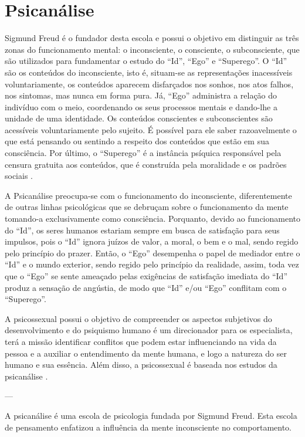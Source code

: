 \section{Psicanálise}\label{psicanalise}

Sigmund Freud é o fundador desta escola e possui o objetivo em distinguir as três zonas do funcionamento mental: o inconsciente, o consciente, o subconsciente, que são utilizados para fundamentar o estudo do ``Id'', ``Ego'' e ``Superego''. 
O ``Id'' são os conteúdos do inconsciente, isto é, situam-se as representações inacessíveis voluntariamente, os conteúdos aparecem disfarçados nos sonhos, nos atos falhos, nos sintomas, mas nunca em forma pura. 
Já, ``Ego'' administra a relação do indivíduo com o meio, coordenando os seus processos mentais e dando-lhe a unidade de uma identidade. Os conteúdos conscientes e subconscientes são acessíveis voluntariamente pelo sujeito. É possível para ele saber razoavelmente o que está pensando ou sentindo a respeito dos conteúdos que estão em sua consciência.
Por último, o ``Superego'' é a instância psíquica responsável pela censura gratuita aos conteúdos, que é construída pela moralidade e os padrões sociais \cite{silva2007psicologia_educacao}.

A Psicanálise preocupa-se com o funcionamento do inconsciente, diferentemente de outras linhas psicológicas que se debruçam sobre o funcionamento da mente tomando-a exclusivamente como consciência.
Porquanto, devido ao funcionamento do ``Id'', os seres humanos estariam sempre em busca de satisfação para seus impulsos, pois o ``Id'' ignora juízos de valor, a moral, o bem e o mal, sendo regido pelo princípio do prazer.
Então, o ``Ego'' desempenha o papel de mediador entre o ``Id'' e o mundo exterior, sendo regido pelo
princípio da realidade, assim, toda vez que o ``Ego'' se sente ameaçado pelas exigências de satisfação
imediata do ``Id'' produz a sensação de angústia, de modo que  ``Id'' e/ou ``Ego'' conflitam com o ``Superego''.

A psicossexual possui o objetivo de compreender os aspectos subjetivos do desenvolvimento e do psiquismo humano é um direcionador para os especialista, terá a missão identificar conflitos que podem estar influenciando na vida da pessoa e a auxiliar o entendimento da mente humana, e logo a natureza do ser humano e sua essência.
Além disso, a psicossexual é baseada nos estudos da psicanálise \cite{silva2007psicologia_educacao}. 


---

A psicanálise é uma escola de psicologia fundada por Sigmund Freud. Esta escola de pensamento enfatizou a influência da mente inconsciente no comportamento.

